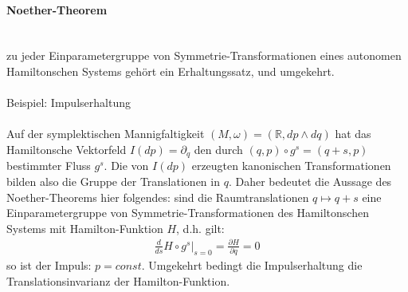 \documentclass[10pt,a4paper]{article}
\begin{document}
\paragraph{Noether-Theorem} $\,$ \\
\\
zu jeder Einparametergruppe von Symmetrie-Transformationen eines autonomen Hamiltonschen Systems gehört ein Erhaltungssatz, und umgekehrt.\\
\\
Beispiel: Impulserhaltung\\
\\
Auf der symplektischen Mannigfaltigkeit $(M,\omega)=(\mathbb{R}, dp \wedge dq) $ hat das Hamiltonsche Vektorfeld $ I (dp)= \partial_q $ den durch $ (q,p) \circ g^s=(q+s,p) $ bestimmter Fluss $g^s$. Die von $ I(dp) $ erzeugten kanonischen Transformationen bilden also die Gruppe der Translationen in $q$. Daher bedeutet die Aussage des Noether-Theorems hier folgendes: sind die Raumtranslationen $ q \longmapsto q+s $ eine Einparametergruppe von Symmetrie-Transformationen des Hamiltonschen Systems mit Hamilton-Funktion $H$, d.h. gilt:
\begin{align}
\frac{d}{ds} H \circ g^s \vert_{s=0} = \frac{\partial H}{\partial q}=0
\end{align}
so ist der Impuls: $p=const.$ Umgekehrt bedingt die Impulserhaltung die Translationsinvarianz der Hamilton-Funktion.
\end{document}
